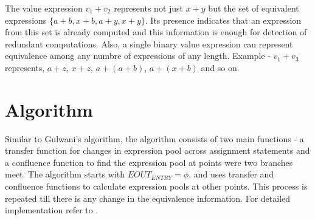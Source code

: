 The value expression $v_1 + v_2$ represents not just $x + y$ but the
set of equivalent expressions $\{a + b, x + b, a + y, x + y\}$. Its 
presence indicates that an expression from this set is already 
computed and this information is enough for detection of redundant 
computations. Also, a single binary value expression can represent 
equivalence among any numbre of expressions of any length. Example - 
$v_1 + v_3$ represents, $a + z$, $x + z$, $a + (a + b)$, 
$a + (x + b)$ and so on.

\section{Algorithm}
\label{sec:Algorithm}
Similar to Gulwani's algorithm, the algorithm consists of two main 
functions - a transfer function for changes in expression pool across 
assignment statements and a confluence function to find the 
expression pool at points were two branches meet. The algorithm 
starts with $EOUT_{ENTRY} = \phi$, and uses transfer and confluence 
functions to calculate expression pools at other points. This process 
is repeated till there is any change in the equivalence information.
For detailed implementation refer to \cite{Saleena}.

